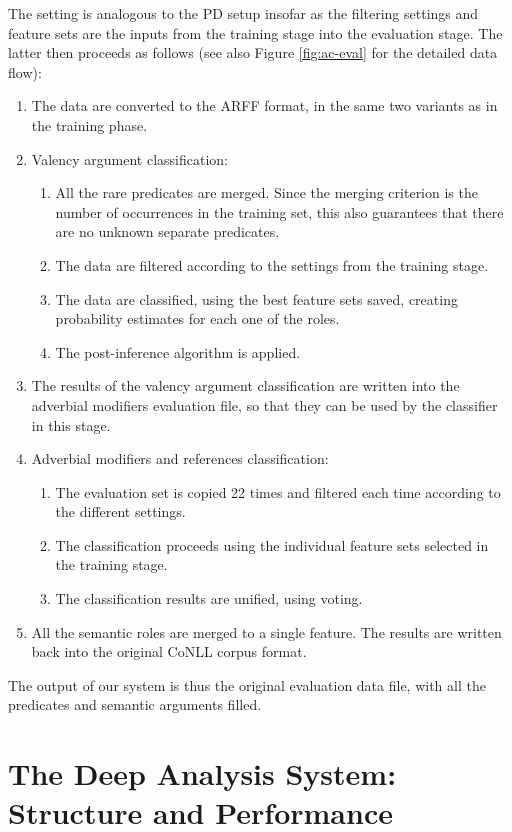 \documentclass[12pt,notitlepage]{report}
\begin{document}
The setting is analogous to the PD setup insofar as the filtering settings and feature sets are the inputs from the training stage into the evaluation stage. The latter then proceeds as follows (see also Figure \ref{fig:ac-eval} for the detailed data flow):
\begin{enumerate}
    \item The data are converted to the ARFF format, in the same two variants as in the training phase.
    \item Valency argument classification:
    \begin{enumerate}
        \item All the rare predicates are merged. Since the merging criterion is the number of occurrences in the training set, this also guarantees that there are no unknown separate predicates.
        \item The data are filtered according to the settings from the training stage.
        \item The data are classified, using the best feature sets saved, creating probability estimates for each one of the roles.
        \item The post-inference algorithm is applied.
    \end{enumerate}
    \item The results of the valency argument classification are written into the adverbial modifiers evaluation file, so that they can be used by the classifier in this stage.
    \item Adverbial modifiers and references classification:
    \begin{enumerate}
        \item The evaluation set is copied 22 times and filtered each time according to the different settings.
        \item The classification proceeds using the individual feature sets selected in the training stage.
        \item The classification results are unified, using voting.
    \end{enumerate}
    \item All the semantic roles are merged to a single feature. The results are written back into the original CoNLL corpus format.
\end{enumerate}
The output of our system is thus the original evaluation data file, with all the predicates and semantic arguments filled.

%
%
\chapter{The Deep Analysis System: Structure and Performance}\label{setup}
%
%
\end{document}
